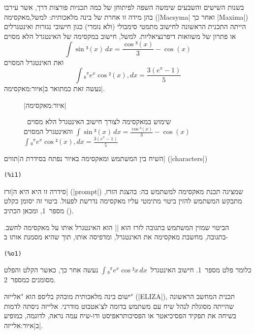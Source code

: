 בשנות השישים והשבעים שימשה השפה לפיתוחן של כמה תכניות פורצות דרך, אשר עירבו בהן
מידה זו אחרת של בינה מלאכותית: למשל,מאקסימה (\E|Macsyma| ואחר כך \E|Maxima|)
הייתה התכנית הראשונה לחישוב מתמטי סימבולי (ולא נומרי) כגון חישובי נגזרות
ואינטגרלים או פתרון של משוואות דיפרנציאליות. למשל, חישוב במקסימה של האינטגרל
הלא מסוים
\begin{equation}
  \label{eq:indefinite}
  ∫\sin³(x)\, dx=\frac{\cos³(x)}3- \cos(x)
\end{equation}
ואת האינטגרל המסוים
\begin{equation}
  \label{eq:definite}
  ∫₀^π e^x\cos²(x),dx=\frac{3 (e^π-1)}{5}
\end{equation} נעשה זאת כמתואר ב|איור:מאקסימה|.

\begin{figure}[H]
\centering
\begin{LTR}
  
\end{LTR}
\caption[שימוש במאקסימה לחישוב אינטגרלים]{שימוש במאקסימה לצורך חישוב האינטגרל הלא
מסוים~$∫\sin³(x)\,dx=\frac{\cos³(x)}3-\cos(x)$ והאינטגרל
המסוים~$∫₀^π e^x\cos²(x),dx=\frac{3(e^π-1)}{5}$}
|איור:מאקסימה|
\end{figure}
השיח בין המשתמש ומאקסימה באיור נפתח בסידרת ה\ע|תווים| (\E|characters|)
\begin{LTR}
\begin{lstlisting}[style=interaction,backgroundcolor=\color{white}]
(%i1)
\end{lstlisting}
\end{LTR}

סידרה זו היא היא ה\ע|זרז| (\E|prompt|) שמציגה תכנת מאקסימה למשתמש בה: בהצגת
הזרז, מתבקש המשתמש להזין ביטוי מתימטי עליו מאקסימה נדרשת לפעול. ביטוי זה יסומן
כקלט מספר~1, ומכאן הכתיב ().

הביטוי שמזין המשתמש בתגובה לזרז הוא \E|| הוא
האינטגרל אותו על מאקסימה לחשב. בתגובה, מחשבת מאקסימה את האינטגרל, ומדפיסה אותו,
תוך שהיא מסמנת אותו ב-
\begin{LTR}
\begin{lstlisting}[style=interaction,backgroundcolor=\color{white}]
(%o1)
\end{lstlisting}
\end{LTR}
 כלומר פלט מספר~1. חישוב האינטגרל~$∫₀^πe^x\cos²x\,dx$ נעשה אחר כך, כאשר הקלט
 והפלט מסומנים כמספר~2.

ישום בינה מלאכותית מובהק בליספ הוא "אלייזה" (\E|ELIZA|), תכנית המחשב הראשונה
שהייתה מסוגלת לנהל שיח עם משתמש בדומה לצ'אטבוט מודרני. אלייזה ניסתה לדמות בשיחה
את תפקיד הפסיכיאטר או הפסיכותראפיסט ודו-שיח עמה נראה, לדוגמה, כמופיע
ב|איור:אלייזה|.

